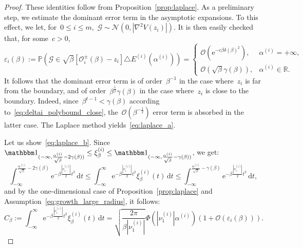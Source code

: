 \documentclass[10pt]{article}
\renewcommand{\d}{\mathrm{d}}
\newcommand{\e}{\mathrm{e}}
\renewcommand{\P}{\mathbb{P}}
\newcommand{\R}{\mathbb{R}}
\newcommand{\1}{\mathbbm 1}
\newcommand{\largeRadius}{\delta}
\newcommand{\smallRadius}{\gamma}
\newcommand{\epsLimit}[1]{\alpha^{(#1)}} %
\newcommand{\localNeighborhood}[2][]{\mathcal{O}_{#2}^{#1}} %
\newcommand{\hessEigval}[2]{\nu^{(#1)}_{#2}} %
\newcommand{\halfSpace}[1]{E^{(#1)}}
\newcommand{\fineCutoff}[1]{\xi_\beta^{(#1)}}
\newcommand{\gammaScalingExp}{t}
\renewcommand{\O}{\mathcal{O}}
\begin{document}
        \begin{proof}
            These identities follow from Proposition~\ref{prop:laplace}. As a preliminary step, we estimate the dominant error term in the asymptotic expansions.
            To this effect, we let, for~$0\leq i\leq m$,~$\mathcal G\sim \mathcal N\left(0,\left|\nabla^2 V(z_i)\right|\right)$.
            It is then easily checked that, for some~$c>0$,
            \begin{equation}
                \varepsilon_i(\beta):=\P\left(\mathcal G \in \sqrt\beta\left[\localNeighborhood[\pm]{i}(\beta)-z_i\right] \triangle \halfSpace{i}(\epsLimit{i})\right) = \begin{cases}
                    \O\left(\e^{-c\beta\largeRadius(\beta)^2}\right),&\epsLimit{i} = +\infty,\\
                    \O\left(\sqrt\beta\smallRadius(\beta)\right),& \epsLimit{i} \in \R.
                \end{cases}
            \end{equation}
            It follows that the dominant error term is of order~$\beta^{-1}$ in the case where~$z_i$ is far from the boundary, and of order~$\beta^{\frac12} \smallRadius(\beta)$ in the case where~$z_i$ is close to the boundary. Indeed, since~$\beta^{\gammaScalingExp-1}<\smallRadius(\beta)$ according to~\ref{eq:deltai_polybound_close}, the~$\O(\beta^{-\frac12})$ error term is absorbed in the latter case.
            The Laplace method yields~\eqref{eq:laplace_a}.

            Let us show~\eqref{eq:laplace_b}.
            Since~$\1_{(-\infty,\frac{\epsLimit{i}}{\sqrt\beta}-2\smallRadius(\beta))} \leq \fineCutoff{i} \leq \1_{(-\infty,\frac{\epsLimit{i}}{\sqrt\beta}-\smallRadius(\beta))}$, we get:
            \begin{equation}
                \label{eq:lemma_laplace_tmp}
            \int_{-\infty}^{\frac{\epsLimit{i}}{\sqrt\beta}-2\smallRadius(\beta)}\e^{-\beta \frac{|\hessEigval{i}{1}|}{2}t^2}\,\d t\leq \int_{-\infty}^\infty \e^{-\beta \frac{|\hessEigval{i}{1}|}{2}t^2} \fineCutoff{i}(t)\,\d t \leq \int_{-\infty}^{\frac{\epsLimit{i}}{\sqrt\beta}-\smallRadius(\beta)} \e^{-\beta \frac{|\hessEigval{i}{1}|}{2}t^2}\,\d t,
            \end{equation}
            and by the one-dimensional case of Proposition~\ref{prop:laplace} and Assumption~\eqref{eq:growth_large_radius}, it follows:
            \begin{equation}
                \label{eq:lemma_laplace_d_beta_estimation}
                C_\beta := \int_{-\infty}^\infty \e^{-\beta \frac{|\hessEigval{i}{1}|}{2}t^2} \fineCutoff{i}(t)\,\d t = \sqrt{\frac{2\pi}{\beta|\hessEigval{i}{1}|}}\Phi(|\hessEigval{i}{1}|\epsLimit{i})\left(1+\O(\varepsilon_i(\beta))\right).
            \end{equation}


\end{proof}
\end{document}
